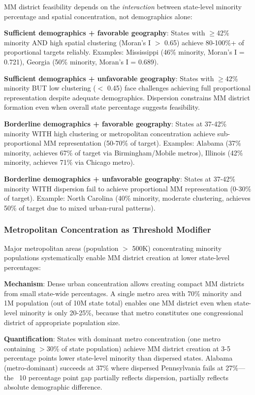 MM district feasibility depends on the \textit{interaction} between state-level minority percentage and spatial concentration, not demographics alone:

\textbf{Sufficient demographics + favorable geography}: States with $\geq$42\% minority AND high spatial clustering (Moran's I $>$ 0.65) achieve 80-100\%+ of proportional targets reliably. Examples: Mississippi (46\% minority, Moran's I = 0.721), Georgia (50\% minority, Moran's I = 0.689).

\textbf{Sufficient demographics + unfavorable geography}: States with $\geq$42\% minority BUT low clustering ($<$ 0.45) face challenges achieving full proportional representation despite adequate demographics. Dispersion constrains MM district formation even when overall state percentage suggests feasibility.

\textbf{Borderline demographics + favorable geography}: States at 37-42\% minority WITH high clustering or metropolitan concentration achieve sub-proportional MM representation (50-70\% of target). Examples: Alabama (37\% minority, achieves 67\% of target via Birmingham/Mobile metros), Illinois (42\% minority, achieves 71\% via Chicago metro).

\textbf{Borderline demographics + unfavorable geography}: States at 37-42\% minority WITH dispersion fail to achieve proportional MM representation (0-30\% of target). Example: North Carolina (40\% minority, moderate clustering, achieves 50\% of target due to mixed urban-rural patterns).

\subsubsection{Metropolitan Concentration as Threshold Modifier}

Major metropolitan areas (population $>$ 500K) concentrating minority populations systematically enable MM district creation at lower state-level percentages:

\textbf{Mechanism}: Dense urban concentration allows creating compact MM districts from small state-wide percentages. A single metro area with 70\% minority and 1M population (out of 10M state total) enables one MM district even when state-level minority is only 20-25\%, because that metro constitutes one congressional district of appropriate population size.

\textbf{Quantification}: States with dominant metro concentration (one metro containing $>$30\% of state population) achieve MM district creation at 3-5 percentage points lower state-level minority than dispersed states. Alabama (metro-dominant) succeeds at 37\% where dispersed Pennsylvania fails at 27\%---the ~10 percentage point gap partially reflects dispersion, partially reflects absolute demographic difference.

